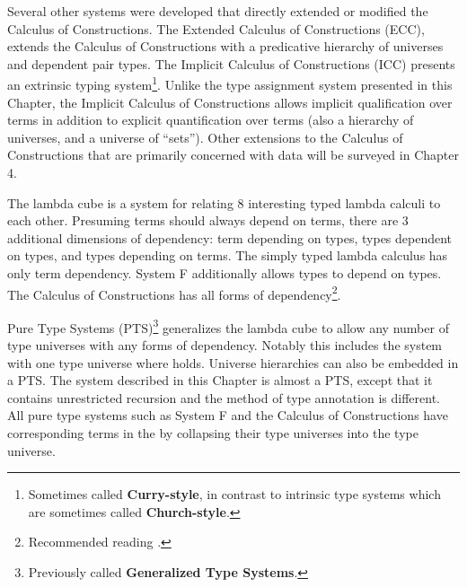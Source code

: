 Several other systems were developed that directly extended or modified the Calculus of Constructions.
The Extended Calculus of Constructions (\ac{ECC})\cite{luo1990extended,luo1994computation}, extends the Calculus of Constructions with a predicative hierarchy of universes and dependent pair types.
The Implicit Calculus of Constructions (\ac{ICC})\cite{10.1007/3-540-45413-6_27,10.1007/978-3-540-78499-9_26} presents an extrinsic typing system\footnote{
  Sometimes called \textbf{Curry-style}, in contrast to intrinsic type systems which are sometimes called \textbf{Church-style}.
}.
Unlike the type assignment system presented in this Chapter, the Implicit Calculus of Constructions allows implicit qualification over terms in addition to explicit quantification over terms (also a hierarchy of universes, and a universe of ``sets'').
Other extensions to the Calculus of Constructions that are primarily concerned with data will be surveyed in Chapter 4.
 
The lambda cube is a system for relating 8 interesting typed lambda calculi to each other.
Presuming terms should always depend on terms, there are 3 additional dimensions of dependency: term depending on types, types dependent on types, and types depending on terms.
The simply typed lambda calculus has only term dependency.
System F additionally allows types to depend on types.
The Calculus of Constructions has all forms of dependency\footnote{Recommended reading \cite[Chapter 14]{sorensen2006lectures}.}.
 
Pure Type Systems (\ac{PTS})\footnote{
  Previously called \textbf{Generalized Type Systems}.
} generalizes the lambda cube to allow any number of type universes with any forms of dependency.
Notably this includes the system with one type universe where \tit{} holds.
Universe hierarchies can also be embedded in a \ac{PTS}.
The system described in this Chapter is almost a \ac{PTS}, except that it contains unrestricted recursion and the method of type annotation is different.
All pure type systems such as System F and the Calculus of Constructions have corresponding terms in the \slang{} by collapsing their type universes into the \slang{} type universe.
 
 
